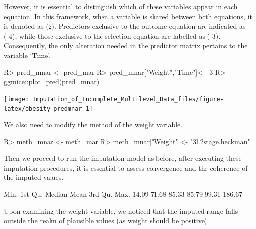 \documentclass[
]{jss}
\begin{document}
However, it is essential to distinguish which of these variables appear
in each equation. In this framework, when a variable is shared between
both equations, it is denoted as (2). Predictors exclusive to the
outcome equation are indicated as (-4), while those exclusive to the
selection equation are labelled as (-3). Consequently, the only
alteration needed in the predictor matrix pertains to the variable
`Time'.

\begin{CodeChunk}
\begin{CodeInput}
R> pred_mnar <- pred_mar
R> pred_mnar["Weight","Time"]<- -3
R> ggmice::plot_pred(pred_mnar)
\end{CodeInput}


\begin{center}\texttt{[image: Imputation\_of\_Incomplete\_Multilevel\_Data\_files/figure-latex/obesity-predmnar-1]} \end{center}

\end{CodeChunk}

We also need to modify the method of the weight variable.

\begin{CodeChunk}
\begin{CodeInput}
R> meth_mnar <- meth_mar
R> meth_mnar["Weight"]<- "3l.2stage.heckman"
\end{CodeInput}
\end{CodeChunk}

Then we proceed to run the imputation model as before, after executing
these imputation procedures, it is essential to assess convergence and
the coherence of the imputed values.

\begin{CodeChunk}
\begin{CodeOutput}
   Min. 1st Qu.  Median    Mean 3rd Qu.    Max. 
  14.09   71.68   85.33   85.79   99.31  186.67 
\end{CodeOutput}
\end{CodeChunk}

Upon examining the weight variable, we noticed that the imputed range
falls outside the realm of plausible values (as weight should be
positive).
\end{document}
